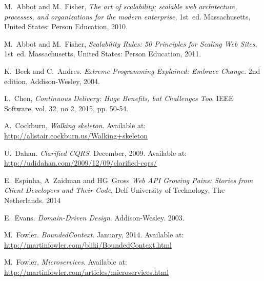 \documentclass[10pt,article]{IEEEtran}
\begin{document}
%
%
%
\begin{thebibliography}{1}

M.~Abbot and M.~Fisher, \emph{The art of scalability: scalable web architecture, processes, and organizations for the modern enterprise}, 1st~ed. Massachusetts, United States: Person Education, 2010.
  
M.~Abbot and M.~Fisher, \emph{Scalability Rules: 50 Principles for Scaling Web Sites}, 1st~ed. Massachusetts, United States: Person Education, 2011.

K.~Beck and C.~Andres. \emph{Extreme Programming Explained: Embrace Change.} 2nd edition, Addison-Wesley, 2004.

L.~Chen, \emph{Continuous Delivery: Huge Benefits, but Challenges Too}, IEEE Software, vol. 32, no 2, 2015, pp. 50-54.

A.~Cockburn, \emph{Walking skeleton}. Available at: \url{http://alistair.cockburn.us/Walking+skeleton}

U.~Dahan. \emph{Clarified CQRS}. December, 2009. Available at: \href{http://udidahan.com/2009/12/09/clarified-cqrs/}{http://udidahan.com/2009/12/09/clarified-cqrs/}

E.~Espinha, A~Zaidman and HG~Gross \emph{Web API Growing Pains: Stories from Client Developers and Their Code}, Delf University of Technology, The Netherlands. 2014

E.~Evans. \emph{Domain-Driven Design}. Addison-Wesley. 2003.

M.~Fowler. \emph{BoundedContext}. January, 2014. Available at: \href{http://martinfowler.com/bliki/BoundedContext.html}{http://martinfowler.com/bliki/BoundedContext.html}

M.~Fowler, \emph{Microservices}. Available at: \url{http://martinfowler.com/articles/microservices.html}


\end{thebibliography}
\end{document}
